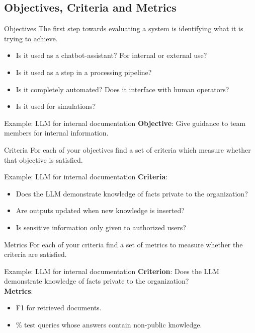 \documentclass[24pt]{beamer}
\newcommand{\subsectionslide}{
	 \begin{frame}
		\sectionpage
		\subsectionpage
	\end{frame}
}
\begin{document}
\subsection{Objectives, Criteria and Metrics}
\subsectionslide

\begin{frame}{Objectives}
	The first step towards evaluating a system is identifying what it is trying to achieve.
	\begin{itemize}
		\item Is it used as a chatbot-assistant? For internal or external use?
		\item Is it used as a step in a processing pipeline?
		\item Is it completely automated? Does it interface with human operators?
		\item Is it used for simulations?
	\end{itemize}
	
	\begin{exampleblock}{Example: LLM for internal documentation}
		\textbf{Objective}: Give guidance to team members for internal information.
	\end{exampleblock}
\end{frame}

\begin{frame}{Criteria}
	For each of your objectives find a set of criteria which measure whether that objective is satisfied.
	\begin{exampleblock}{Example: LLM for internal documentation}
		\textbf{Criteria}:
		\begin{itemize}
			\item Does the LLM demonstrate knowledge of facts private to the organization?
			\item Are outputs updated when new knowledge is inserted?
			\item Is sensitive information only given to authorized users?
		\end{itemize}
	\end{exampleblock}
\end{frame}

\begin{frame}{Metrics}
	For each of your criteria find a set of metrics to measure whether the criteria are satisfied.
	\begin{exampleblock}{Example: LLM for internal documentation}
		\textbf{Criterion}: Does the LLM demonstrate knowledge of facts private to the organization?\\
		\textbf{Metrics}:
		\begin{itemize}
			\item F1 for retrieved documents.
			\item \% test queries whose answers contain non-public knowledge. 
		\end{itemize}
	\end{exampleblock}
\end{frame}
\end{document}
